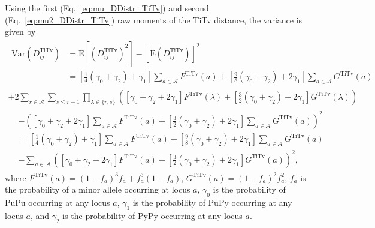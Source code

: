 \documentclass[10pt,letterpaper]{article}
\begin{document}
Using the first (Eq.~\ref{eq:mu_DDistr_TiTv}) and second (Eq.~\ref{eq:mu2_DDistr_TiTv}) raw moments of the TiTv distance, the variance is given by
%
\begin{equation}\label{eq:var_DDistr_TiTv}
\begin{split}
\begin{aligned}
\text{Var}\left(D^\text{TiTv}_{ij}\right) &= \text{E}\left[\left(D^\text{TiTv}_{ij}\right)^2\right] - \left[\text{E}\left(D^\text{TiTv}_{ij}\right)\right]^2 \\
&=\left[\frac{1}{4}(\gamma_0 + \gamma_2) + \gamma_1\right] \sum_{a \in \mathcal{A}} F^\text{TiTv}(a) + \left[\frac{9}{8}(\gamma_0 + \gamma_2) + 2\gamma_1\right] \sum_{a \in \mathcal{A}} G^\text{TiTv}(a)
\end{aligned} \\
+ 2 \sum_{r \in \mathcal{A}} \sum_{s \leq r - 1} \prod_{\lambda \in \{r,s\}} \left([\gamma_0 + \gamma_2 + 2\gamma_1] F^\text{TiTv}(\lambda) + \left[\frac{3}{2}(\gamma_0 + \gamma_2) + 2\gamma_1\right] G^\text{TiTv}(\lambda)\right) \\
\begin{aligned}
&- \left([\gamma_0 + \gamma_2 + 2\gamma_1] \sum_{a \in \mathcal{A}} F^\text{TiTv}(a) + \left[\frac{3}{2}(\gamma_0 + \gamma_2) + 2\gamma_1\right] \sum_{a \in \mathcal{A}} G^\text{TiTv}(a)\right)^2 \\
&=\left[\frac{1}{4}(\gamma_0 + \gamma_2) + \gamma_1\right] \sum_{a \in \mathcal{A}} F^\text{TiTv}(a) + \left[\frac{9}{8}(\gamma_0 + \gamma_2) + 2\gamma_1\right] \sum_{a \in \mathcal{A}} G^\text{TiTv}(a) \\
&- \sum_{a \in \mathcal{A}} \left([\gamma_0 + \gamma_2 + 2\gamma_1] F^\text{TiTv}(a) + \left[\frac{3}{2}(\gamma_0 + \gamma_2) + 2\gamma_1\right] G^\text{TiTv}(a)\right)^2,
\end{aligned}
\end{split}
\end{equation}
%
where $F^\text{TiTv}(a) = (1 - f_a)^3 f_a + f^3_a (1 - f_a)$, $G^\text{TiTv}(a) = (1 - f_a)^2 f^2_a$, $f_a$ is the probability of a minor allele occurring at locus $a$, $\gamma_0$ is the probability of PuPu occurring at any locus $a$, $\gamma_1$ is the probability of PuPy occurring at any locus $a$, and $\gamma_2$ is the probability of PyPy occurring at any locus $a$.
\end{document}
